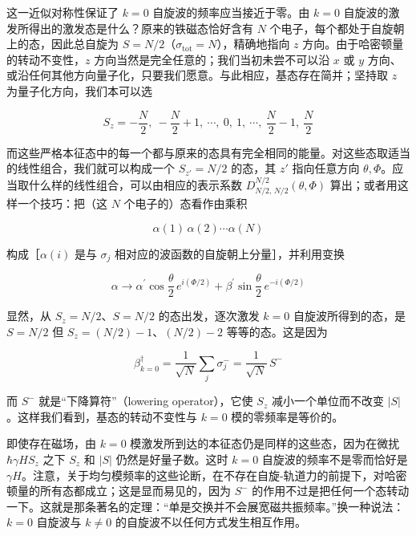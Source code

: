 这一近似对称性保证了 $k=0$ 自旋波的频率应当接近于零。由 $k=0$ 自旋波的激发所得出的激发态是什么？原来的铁磁态恰好含有 $N$ 个电子，每个都处于自旋朝上的态，因此总自旋为 $S = N/2$（$\sigma_{\mathrm{tot}} = N$），精确地指向 $z$ 方向。由于哈密顿量的转动不变性，$z$ 方向当然是完全任意的；我们当初未尝不可以沿 $x$ 或 $y$ 方向、或沿任何其他方向量子化，只要我们愿意。与此相应，基态存在简并；坚持取 $z$ 为量子化方向，我们本可以选

\begin{equation*}
S_{z} = -\frac{N}{2},\ -\frac{N}{2} + 1,\ \cdots,\ 0,\ 1,\ \cdots,\ \frac{N}{2} - 1,\ \frac{N}{2}
\end{equation*}

而这些严格本征态中的每一个都与原来的态具有完全相同的能量。对这些态取适当的线性组合，我们就可以构成一个 $S_{z'} = N/2$ 的态，其 $z'$ 指向任意方向 $\theta,\Phi$。应当取什么样的线性组合，可以由相应的表示系数 $D^{N/2}_{N/2,\,N/2}(\theta,\Phi)$ 算出；或者用这样一个技巧：把（这 $N$ 个电子的）态看作由乘积

\begin{equation*}
\alpha(1)\,\alpha(2)\cdots\alpha(N)
\end{equation*}

构成［$\alpha(i)$ 是与 $\sigma_{j}$ 相对应的波函数的自旋朝上分量］，并利用变换

\begin{equation*}
\alpha \rightarrow \alpha^{'}\cos\frac{\theta}{2}\, e^{i(\Phi/2)} + \beta^{'}\sin\frac{\theta}{2}\, e^{-i(\Phi/2)}
\end{equation*}

显然，从 $S_{z} = N/2$、$S = N/2$ 的态出发，逐次激发 $k=0$ 自旋波所得到的态，是 $S = N/2$ 但 $S_{z} = (N/2) - 1$、$(N/2) - 2$ 等等的态。这是因为

\begin{equation*}
\beta^{\dagger}_{k=0} = \frac{1}{\sqrt{N}}\sum_{j}\sigma^{-}_{j} = \frac{1}{\sqrt{N}}\,S^{-}
\end{equation*}

而 $S^{-}$ 就是“下降算符”（lowering operator），它使 $S_{z}$ 减小一个单位而不改变 $|S|$。这样我们看到，基态的转动不变性与 $k=0$ 模的零频率是等价的。

即使存在磁场，由 $k=0$ 模激发所到达的本征态仍是同样的这些态，因为在微扰 $\hbar\gamma H S_{z}$ 之下 $S_{z}$ 和 $|S|$ 仍然是好量子数。这时 $k=0$ 自旋波的频率不是零而恰好是 $\gamma H$。注意，关于均匀模频率的这些论断，在不存在自旋-轨道力的前提下，对哈密顿量的所有态都成立；这是显而易见的，因为 $S^{-}$ 的作用不过是把任何一个态转动一下。这就是那条著名的定理：“单是交换并不会展宽磁共振频率。”换一种说法：$k=0$ 自旋波与 $k\neq 0$ 的自旋波不以任何方式发生相互作用。

